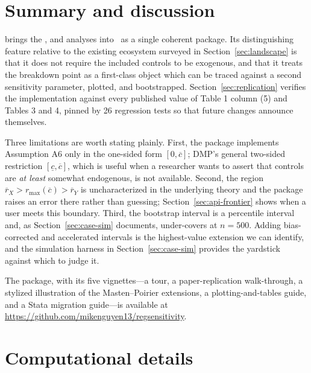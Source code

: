 \documentclass[article]{jss}\usepackage[]{graphicx}\usepackage[]{xcolor}
\newcommand{\Rlang}{\proglang{R}}
\newcommand{\rxbar}{\ensuremath{\overline{r}_X}}
\newcommand{\rybar}{\ensuremath{\overline{r}_Y}}
\newcommand{\cbar}{\ensuremath{\overline{c}}}
\newcommand{\clow}{\ensuremath{\underline{c}}}
\begin{document}
\section{Summary and discussion}\label{sec:concl}

 brings the \citet{Diegert2026}, \citet{Oster2019} and
\citet{Masten2026} analyses into \Rlang\ as a single coherent package. Its
distinguishing feature relative to the existing ecosystem surveyed in
Section~\ref{sec:landscape} is that it does not require the included
controls to be exogenous, and that it treats the breakdown point as a
first-class object which can be traced against a second sensitivity
parameter, plotted, and bootstrapped. Section~\ref{sec:replication}
verifies the implementation against every published value of
\citet{Diegert2026} Table 1 column (5) and Tables 3 and 4, pinned by 26
regression tests so that future changes announce themselves.

Three limitations are worth stating plainly. First, the package implements
Assumption A6 only in the one-sided form $[0, \cbar]$; DMP's general
two-sided restriction $[\clow, \cbar]$, which is useful when a researcher
wants to assert that controls are \emph{at least} somewhat endogenous, is
not available. Second, the region
$\rxbar > r_{\max}(\cbar) > \rybar$ is uncharacterized in the underlying
theory and the package raises an error there rather than guessing;
Section~\ref{sec:api-frontier} shows when a user meets this boundary.
Third, the bootstrap interval is a percentile interval and, as
Section~\ref{sec:case-sim} documents, under-covers at $n = 500$. Adding
bias-corrected and accelerated intervals is the highest-value extension we
can identify, and the simulation harness in Section~\ref{sec:case-sim}
provides the yardstick against which to judge it.

The package, with its five vignettes---a tour, a paper-replication
walk-through, a stylized illustration of the Masten--Poirier
extensions, a plotting-and-tables guide, and a Stata migration
guide---is available at
\url{https://github.com/mikenguyen13/regsensitivity}.

\section*{Computational details}
\end{document}
